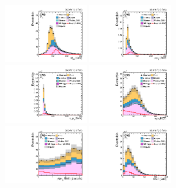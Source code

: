 \begin{figure}[htpb]\centering
 \includegraphics[width=0.315\textwidth]{chapter6/BDTvariable/LFV_preselection_collMass_type1_Fakes_PoissonErrors.pdf}
 \includegraphics[width=0.315\textwidth]{chapter6/BDTvariable/LFV_preselection_mPt_Fakes_PoissonErrors.pdf} \\
 \includegraphics[width=0.315\textwidth]{chapter6/BDTvariable/LFV_preselection_tPt_Fakes_PoissonErrors.pdf}
 \includegraphics[width=0.315\textwidth]{chapter6/BDTvariable/LFV_preselection_tMtToPfMet_type1_Fakes_PoissonErrors.pdf}  \\
 \includegraphics[width=0.315\textwidth]{chapter6/BDTvariable/LFV_preselection_tDPhiToPfMet_type1_Fakes_PoissonErrors.pdf}
 \includegraphics[width=0.315\textwidth]{chapter6/BDTvariable/LFV_preselection_type1_pfMetEt_Fakes_PoissonErrors.pdf} \\

\end{figure}
